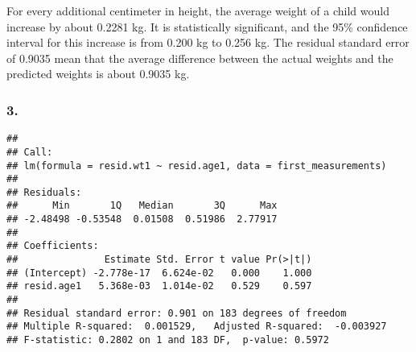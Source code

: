 \documentclass[
]{article}
\newenvironment{Shaded}{\begin{snugshade}}{\end{snugshade}}
\newcommand{\AttributeTok}[1]{\textcolor[rgb]{0.13,0.29,0.53}{#1}}
\newcommand{\CommentTok}[1]{\textcolor[rgb]{0.56,0.35,0.01}{\textit{#1}}}
\newcommand{\FunctionTok}[1]{\textcolor[rgb]{0.13,0.29,0.53}{\textbf{#1}}}
\newcommand{\NormalTok}[1]{#1}
\newcommand{\OtherTok}[1]{\textcolor[rgb]{0.56,0.35,0.01}{#1}}
\newcommand{\SpecialCharTok}[1]{\textcolor[rgb]{0.81,0.36,0.00}{\textbf{#1}}}
\begin{document}
For every additional centimeter in height, the average weight of a child
would increase by about 0.2281 kg. It is statistically significant, and
the 95\% confidence interval for this increase is from 0.200 kg to 0.256
kg. The residual standard error of 0.9035 mean that the average
difference between the actual weights and the predicted weights is about
0.9035 kg.

\subsubsection{3.}\label{section-14}

\begin{Shaded}
\end{Shaded}

\begin{verbatim}
## 
## Call:
## lm(formula = resid.wt1 ~ resid.age1, data = first_measurements)
## 
## Residuals:
##      Min       1Q   Median       3Q      Max 
## -2.48498 -0.53548  0.01508  0.51986  2.77917 
## 
## Coefficients:
##               Estimate Std. Error t value Pr(>|t|)
## (Intercept) -2.778e-17  6.624e-02   0.000    1.000
## resid.age1   5.368e-03  1.014e-02   0.529    0.597
## 
## Residual standard error: 0.901 on 183 degrees of freedom
## Multiple R-squared:  0.001529,   Adjusted R-squared:  -0.003927 
## F-statistic: 0.2802 on 1 and 183 DF,  p-value: 0.5972
\end{verbatim}
\end{document}
